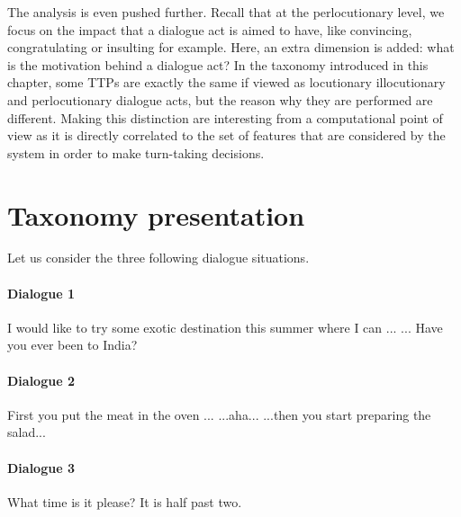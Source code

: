         The analysis is even pushed further. Recall that at the perlocutionary level, we focus on the impact that a dialogue act is aimed to have, like convincing, congratulating or insulting for example. Here, an extra dimension is added: what is the motivation behind a dialogue act? In the taxonomy introduced in this chapter, some TTPs are exactly the same if viewed as locutionary illocutionary and perlocutionary dialogue acts, but the reason why they are performed are different. Making this distinction are interesting from a computational point of view as it is directly correlated to the set of features that are considered by the system in order to make turn-taking decisions.

\section{Taxonomy presentation}


        Let us consider the three following dialogue situations.

        \paragraph{Dialogue 1}

        \begin{dialogue}
           I would like to try some exotic destination this summer where I can ...
           ... Have you ever been to India?
        \end{dialogue}

        \paragraph{Dialogue 2}

        \begin{dialogue}
           First you put the meat in the oven ...
           ...aha...
           ...then you start preparing the salad...
        \end{dialogue}

        \paragraph{Dialogue 3}

        \begin{dialogue}
           What time is it please?
           It is half past two.
        \end{dialogue}

